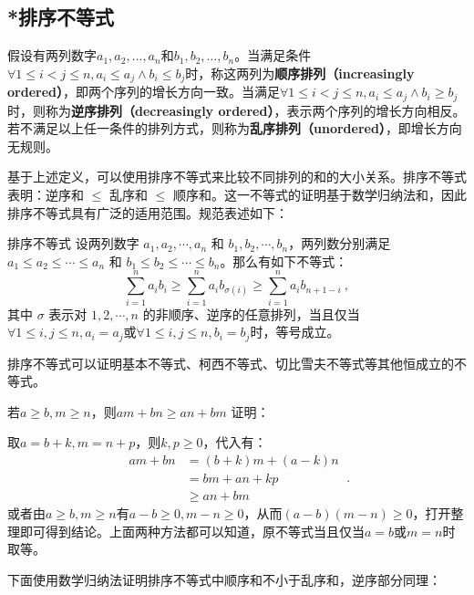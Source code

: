 \subsection{*排序不等式}

假设有两列数字$a_1, a_2, \dots, a_n$和$b_1, b_2, \dots, b_n$。当满足条件$\forall 1 \leq i < j \leq n,  a_i \leq a_j \land b_i \leq b_j$时，称这两列为\textbf{顺序排列（increasingly ordered）}，即两个序列的增长方向一致。当满足$\forall 1 \leq i < j \leq n,  a_i \leq a_j \land b_i \geq b_j$时，则称为\textbf{逆序排列（decreasingly ordered）}，表示两个序列的增长方向相反。若不满足以上任一条件的排列方式，则称为\textbf{乱序排列（unordered）}，即增长方向无规则。

基于上述定义，可以使用排序不等式来比较不同排列的和的大小关系。排序不等式表明：逆序和 $\leq$ 乱序和 $\leq$ 顺序和。这一不等式的证明基于数学归纳法和，因此排序不等式具有广泛的适用范围。规范表述如下：

\begin{theorem}{排序不等式}
设两列数字 $a_1, a_2, \cdots, a_n$ 和 $b_1, b_2, \cdots, b_n$，两列数分别满足 $a_1 \leq a_2 \leq \cdots \leq a_n$ 和 $b_1 \leq b_2 \leq \cdots \leq b_n$。那么有如下不等式：
\begin{equation}
\sum_{i=1}^n a_i b_i \geq \sum_{i=1}^n a_i b_{\sigma(i)} \geq \sum_{i=1}^n a_i b_{n+1-i}~,
\end{equation}
其中 $\sigma$ 表示对 ${1, 2, \cdots, n}$ 的非顺序、逆序的任意排列，当且仅当$\forall 1\leq i,j\leq n,a_i=a_j$或$\forall 1\leq i,j\leq n,b_i=b_j$时，等号成立。
\end{theorem}

排序不等式可以证明基本不等式、柯西不等式、切比雪夫不等式等其他恒成立的不等式。

\begin{lemma}{若$a\geq b,m\geq n$，则$am+bn\geq an+bm$}\label{lem_HsEquN_1}
证明：

取$a=b+k,m=n+p$，则$k,p\geq0$，代入有：
\begin{equation}
\begin{split}
am+bn&= (b+k)m+(a-k)n \\ 
&= bm+an+kp \\
&\geq an+bm
\end{split}~.
\end{equation}
或者由$a\geq b,m\geq n$有$a-b\geq 0,m- n\geq0$，从而$(a-b)(m- n)\geq0$，打开整理即可得到结论。上面两种方法都可以知道，原不等式当且仅当$a=b$或$m=n$时取等。
\end{lemma}

下面使用数学归纳法证明排序不等式中顺序和不小于乱序和，逆序部分同理：

